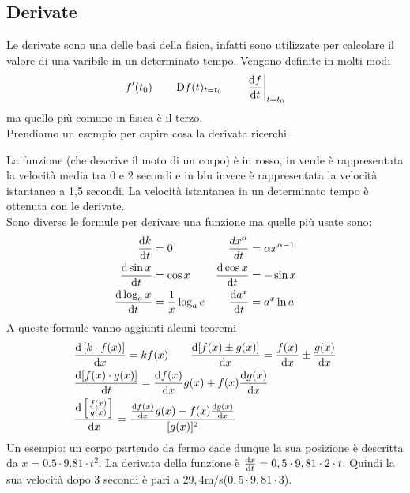 \subsection{Derivate}
Le derivate sono una delle basi della fisica, infatti sono utilizzate per calcolare il valore di 
una varibile in un determinato tempo. Vengono definite in molti modi 
\begin{equation*}
  f'(t_0) \qquad \mathop{}\!\mathrm{D} f(t)_{t=t_0}\qquad \left.\frac{\mathop{}\!\mathrm{d} f}{\mathop{}\!\mathrm{d} t}\right|_{t=t_0}
\end{equation*}
ma quello più comune in fisica è il terzo.\\
Prendiamo un esempio per capire cosa la derivata ricerchi.
\begin{center}
\end{center}
La funzione (che descrive il moto di un corpo) è in rosso, in verde è rappresentata la velocità 
media tra $0$ e $2$ secondi e in blu invece è rappresentata la velocità istantanea a 1,5 secondi. 
La velocità istantanea in un determinato tempo è ottenuta con le derivate.\\
Sono diverse le formule per derivare una funzione ma quelle più usate sono:
\begin{align*}
  \frac{\dif k}{\dif t}&=0 &\quad \frac{dx^\alpha}{dt}&=\alpha x^{\alpha-1}\\
  \frac{\dif\sin x}{\dif t}&=\cos x & \frac{\dif\cos x}{\dif t}&=-\sin x\\
  \frac{\dif\log_ax}{\dif t}&=\frac{1}{x}\log_ae & \frac{\dif a^{x}}{\dif t}&=a^{x}\ln a
\end{align*}
A queste formule vanno aggiunti alcuni teoremi
\begin{align*}
  &\frac{\dif\left[k\cdot f(x) \right]}{\dif x}=kf(x)\qquad
  \frac{\dif[f(x)\pm g(x)]}{\dif x}=\frac{f(x)}{\dif x}\pm \frac{g(x)}{\dif x}\\
    &\frac{\dif [f(x)\cdot g(x)]}{\dif t}=\frac{\dif f(x)}{\dif x}g(x) + 
    f(x)\frac{\dif g(x)}{\dif x}\\
  &\frac{\dif \left[\frac{f(x)}{g(x)}\right]}{\dif x} =
    \frac{\frac{\dif f(x)}{\dif x}g(x)-f(x)\frac{\dif g(x)}{\dif x}}{[g(x)]^2}
\end{align*}
Un esempio: un corpo partendo da fermo cade dunque la sua posizione è descritta da 
$x=0.5\cdot9.81\cdot t^{2}$. La derivata della funzione è 
$\frac{\mathop{}\!\mathrm{d} x}{\mathop{}\!\mathrm{d} t}=0,5\cdot9,81\cdot2\cdot t$. 
Quindi la sua velocità dopo 3 secondi è pari a $29,4$m/s($0,5\cdot9,81\cdot3$).
